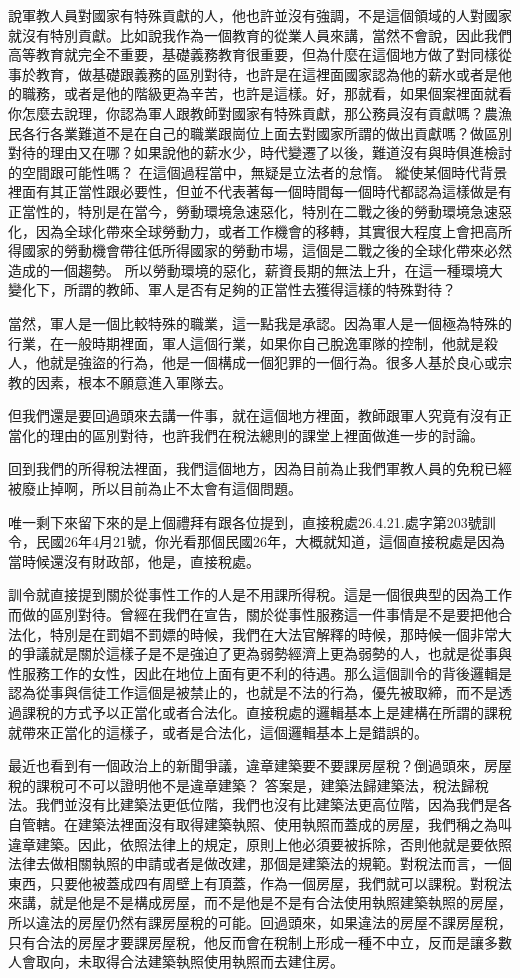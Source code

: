 \documentclass[oneside,sub3section]{ctexbook}
\begin{document}
說軍教人員對國家有特殊貢獻的人，他也許並沒有強調，不是這個領域的人對國家就沒有特別貢獻。比如說我作為一個教育的從業人員來講，當然不會說，因此我們高等教育就完全不重要，基礎義務教育很重要，但為什麼在這個地方做了對同樣從事於教育，做基礎跟義務的區別對待，也許是在這裡面國家認為他的薪水或者是他的職務，或者是他的階級更為辛苦，也許是這樣。好，那就看，如果個案裡面就看你怎麼去說理，你認為軍人跟教師對國家有特殊貢獻，那公務員沒有貢獻嗎？農漁民各行各業難道不是在自己的職業跟崗位上面去對國家所謂的做出貢獻嗎？做區別對待的理由又在哪？如果說他的薪水少，時代變遷了以後，難道沒有與時俱進檢討的空間跟可能性嗎？ 在這個過程當中，無疑是立法者的怠惰。
縱使某個時代背景裡面有其正當性跟必要性，但並不代表著每一個時間每一個時代都認為這樣做是有正當性的，特別是在當今，勞動環境急速惡化，特別在二戰之後的勞動環境急速惡化，因為全球化帶來全球勞動力，或者工作機會的移轉，其實很大程度上會把高所得國家的勞動機會帶往低所得國家的勞動市場，這個是二戰之後的全球化帶來必然造成的一個趨勢。
所以勞動環境的惡化，薪資長期的無法上升，在這一種環境大變化下，所謂的教師、軍人是否有足夠的正當性去獲得這樣的特殊對待？

當然，軍人是一個比較特殊的職業，這一點我是承認。因為軍人是一個極為特殊的行業，在一般時期裡面，軍人這個行業，如果你自己脫逸軍隊的控制，他就是殺人，他就是強盜的行為，他是一個構成一個犯罪的一個行為。很多人基於良心或宗教的因素，根本不願意進入軍隊去。

但我們還是要回過頭來去講一件事，就在這個地方裡面，教師跟軍人究竟有沒有正當化的理由的區別對待，也許我們在稅法總則的課堂上裡面做進一步的討論。

回到我們的所得稅法裡面，我們這個地方，因為目前為止我們軍教人員的免稅已經被廢止掉啊，所以目前為止不太會有這個問題。

唯一剩下來留下來的是上個禮拜有跟各位提到，直接稅處26.4.21.處字第203號訓令，民國26年4月21號，你光看那個民國26年，大概就知道，這個直接稅處是因為當時候還沒有財政部，他是，直接稅處。

訓令就直接提到關於從事性工作的人是不用課所得稅。這是一個很典型的因為工作而做的區別對待。曾經在我們在宣告，關於從事性服務這一件事情是不是要把他合法化，特別是在罰娼不罰嫖的時候，我們在大法官解釋的時候，那時候一個非常大的爭議就是關於這樣子是不是強迫了更為弱勢經濟上更為弱勢的人，也就是從事與性服務工作的女性，因此在地位上面有更不利的待遇。那么這個訓令的背後邏輯是認為從事與信徒工作這個是被禁止的，也就是不法的行為，優先被取締，而不是透過課稅的方式予以正當化或者合法化。直接稅處的邏輯基本上是建構在所謂的課稅就帶來正當化的這樣子，或者是合法化，這個邏輯基本上是錯誤的。

最近也看到有一個政治上的新聞爭議，違章建築要不要課房屋稅？倒過頭來，房屋稅的課稅可不可以證明他不是違章建築？ 答案是，建築法歸建築法，稅法歸稅法。我們並沒有比建築法更低位階，我們也沒有比建築法更高位階，因為我們是各自管轄。在建築法裡面沒有取得建築執照、使用執照而蓋成的房屋，我們稱之為叫違章建築。因此，依照法律上的規定，原則上他必須要被拆除，否則他就是要依照法律去做相關執照的申請或者是做改建，那個是建築法的規範。對稅法而言，一個東西，只要他被蓋成四有周壁上有頂蓋，作為一個房屋，我們就可以課稅。對稅法來講，就是他是不是構成房屋，而不是他是不是有合法使用執照建築執照的房屋，所以違法的房屋仍然有課房屋稅的可能。回過頭來，如果違法的房屋不課房屋稅，只有合法的房屋才要課房屋稅，他反而會在稅制上形成一種不中立，反而是讓多數人會取向，未取得合法建築執照使用執照而去建住房。
\end{document}
